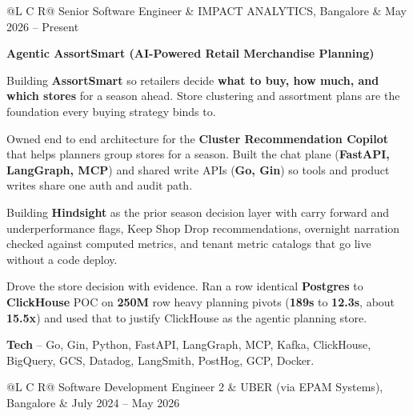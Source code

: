 
\noindent
\begin{tabularx}{\textwidth}{@{}L C R@{}}
\textcolor{role}{Senior Software Engineer} & \textcolor{company}{IMPACT ANALYTICS, Bangalore} & \textcolor{date}{May 2026 -- Present}\\
\end{tabularx}
\vspace{-2ex}

\textcolor{Project}{\textbf{Agentic AssortSmart (AI-Powered Retail Merchandise Planning)}}
\vspace{-1ex}
\begin{zitemize}
    \item Building \textbf{AssortSmart} so retailers decide \textbf{what to buy, how much, and which stores} for a season ahead. Store clustering and assortment plans are the foundation every buying strategy binds to.
    \item Owned end to end architecture for the \textbf{Cluster Recommendation Copilot} that helps planners group stores for a season. Built the chat plane (\textbf{FastAPI, LangGraph, MCP}) and shared write APIs (\textbf{Go, Gin}) so tools and product writes share one auth and audit path.
    \item Building \textbf{Hindsight} as the prior season decision layer with carry forward and underperformance flags, Keep Shop Drop recommendations, overnight narration checked against computed metrics, and tenant metric catalogs that go live without a code deploy.
    \item Drove the store decision with evidence. Ran a row identical \textbf{Postgres} to \textbf{ClickHouse} POC on \textbf{250M} row heavy planning pivots (\textbf{189s} to \textbf{12.3s}, about \textbf{15.5x}) and used that to justify ClickHouse as the agentic planning store.
    \item \textbf{Tech} -- Go, Gin, Python, FastAPI, LangGraph, MCP, Kafka, ClickHouse, BigQuery, GCS, Datadog, LangSmith, PostHog, GCP, Docker.
\end{zitemize}

\vspace{0.2ex}
\noindent
\begin{tabularx}{\textwidth}{@{}L C R@{}}
\textcolor{role}{Software Development Engineer 2} & \textcolor{company}{UBER (via EPAM Systems), Bangalore} & \textcolor{date}{July 2024 -- May 2026}\\
\end{tabularx}
\vspace{-2ex}

